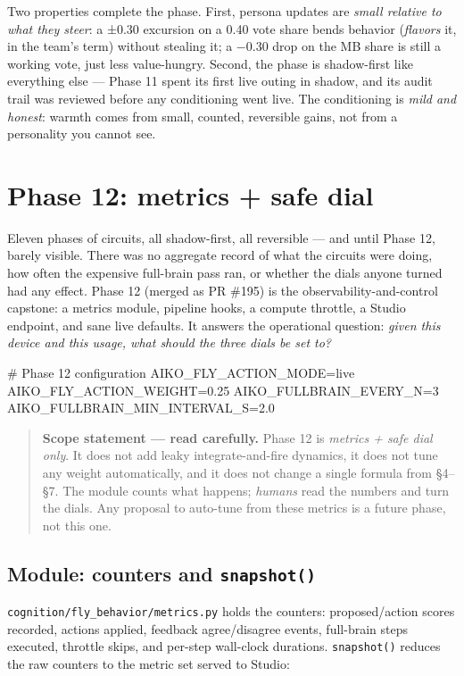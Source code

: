 \documentclass[11pt]{article}
\begin{document}
Two properties complete the phase. First, persona updates are \emph{small relative to what they steer}: a ±0.30 excursion on a 0.40 vote share bends behavior (\emph{flavors} it, in the team's term) without stealing it; a −0.30 drop on the MB share is still a working vote, just less value-hungry. Second, the phase is shadow-first like everything else — Phase 11 spent its first live outing in shadow, and its audit trail was reviewed before any conditioning went live. The conditioning is \emph{mild and honest}: warmth comes from small, counted, reversible gains, not from a personality you cannot see.

\section{Phase 12: metrics + safe dial}

Eleven phases of circuits, all shadow-first, all reversible — and until Phase 12, barely visible. There was no aggregate record of what the circuits were doing, how often the expensive full-brain pass ran, or whether the dials anyone turned had any effect. Phase 12 (merged as PR \#195) is the observability-and-control capstone: a metrics module, pipeline hooks, a compute throttle, a Studio endpoint, and sane live defaults. It answers the operational question: \emph{given this device and this usage, what should the three dials be set to?}

\begin{CodeBlock}
# Phase 12 configuration
AIKO_FLY_ACTION_MODE=live
AIKO_FLY_ACTION_WEIGHT=0.25
AIKO_FULLBRAIN_EVERY_N=3
AIKO_FULLBRAIN_MIN_INTERVAL_S=2.0
\end{CodeBlock}

\begin{quote}
\small \textbf{Scope statement — read carefully.} Phase 12 is \emph{metrics + safe dial only}. It does not add leaky integrate-and-fire dynamics, it does not tune any weight automatically, and it does not change a single formula from §4–§7. The module counts what happens; \emph{humans} read the numbers and turn the dials. Any proposal to auto-tune from these metrics is a future phase, not this one.
\end{quote}

\subsection{Module: counters and \texttt{snapshot()}}

\texttt{cognition/fly\_behavior/metrics.py} holds the counters: proposed/action scores recorded, actions applied, feedback agree/disagree events, full-brain steps executed, throttle skips, and per-step wall-clock durations. \texttt{snapshot()} reduces the raw counters to the metric set served to Studio:
\end{document}
